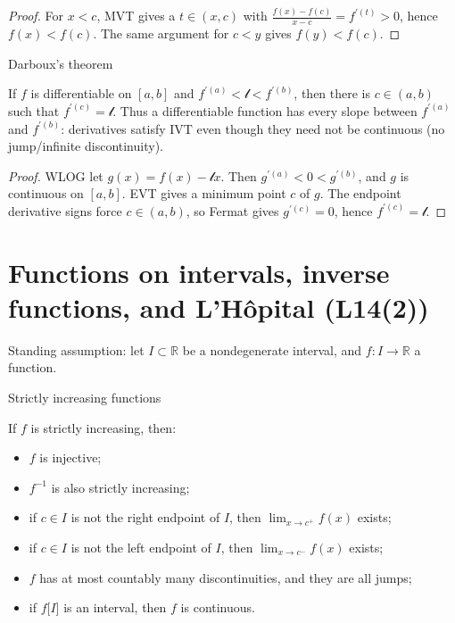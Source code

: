 \begin{proof}

For \(x < c\), MVT gives a \(t \in \left( {x,c} \right)\) with \(\frac{f(x) - f(c)}{x - c} = f^{'{(t)}} > 0\), hence \(f(x) < f(c)\). The same argument for \(c < y\) gives \(f(y) < f(c)\).

\end{proof}

\begin{theorem}{Darboux's theorem}

If \(f\) is differentiable on \(\left\lbrack {a,b} \right\rbrack\) and \(f^{'{(a)}} < \mathcal{l} < f^{'{(b)}}\), then there is \(c \in \left( {a,b} \right)\) such that \(f^{'{(c)}} = \mathcal{l}\). Thus a differentiable function has every slope between \(f^{'{(a)}}\) and \(f^{'{(b)}}\): derivatives satisfy IVT even though they need not be continuous (no jump/infinite discontinuity).

\end{theorem}

\begin{proof}

WLOG let \(g(x) = f(x) - \mathcal{l}x\). Then \(g^{'{(a)}} < 0 < g^{'{(b)}}\), and \(g\) is continuous on \(\left\lbrack {a,b} \right\rbrack\). EVT gives a minimum point \(c\) of \(g\). The endpoint derivative signs force \(c \in \left( {a,b} \right)\), so Fermat gives \(g^{'{(c)}} = 0\), hence \(f^{'{(c)}} = \mathcal{l}\).

\end{proof}

\section{Functions on intervals, inverse functions, and L'Hôpital (L14(2))}

Standing assumption: let \(I \subset \mathbb{R}\) be a nondegenerate interval, and \(f:I\rightarrow\mathbb{R}\) a function.

\begin{theorem}{Strictly increasing functions}

If \(f\) is strictly increasing, then:

\begin{itemize}
\tightlist
\item
  \(f\) is injective;
\item
  \(f^{- 1}\) is also strictly increasing;
\item
  if \(c \in I\) is not the right endpoint of \(I\), then \(\lim_{x\rightarrow c^{+}}f(x)\) exists;
\item
  if \(c \in I\) is not the left endpoint of \(I\), then \(\lim_{x\rightarrow c^{-}}f(x)\) exists;
\item
  \(f\) has at most countably many discontinuities, and they are all jumps;
\item
  if \(f\lbrack I\rbrack\) is an interval, then \(f\) is continuous.
\end{itemize}

\end{theorem}

